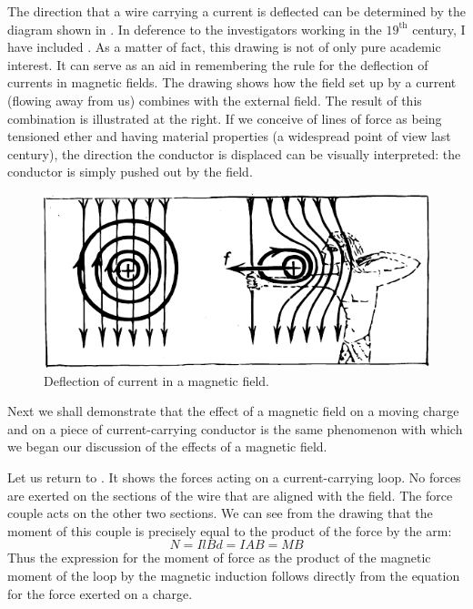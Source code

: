 The direction that a wire carrying a current is deflected can be determined by the diagram shown in . In deference to the investigators working in the $19^{\textrm{th}}$ century, I have included . As a matter of fact, this drawing is not of only pure academic interest. It can serve as an aid in remembering the rule for the deflection of currents in magnetic fields. The drawing shows how the field set up by a current (flowing away from us) combines with the external field. The result of this combination is illustrated at the right. If we conceive of lines of force as being tensioned ether and having material properties (a widespread point of view last century), the direction the conductor is displaced can be visually interpreted: the conductor is simply pushed out by the field.
\begin{figure}[!ht]
\centering
\includegraphics[width=\textwidth]{figures/fig-03-04.pdf}
\caption{Deflection of current in a magnetic field.}
\label{fig-3.4}
\end{figure}
Next we shall demonstrate that the effect of a magnetic field on a moving charge and on a piece of current-carrying conductor is the same phenomenon with which we began our discussion of the effects of a magnetic field.

Let us return to . It shows the forces acting on a current-carrying loop. No forces are exerted on the sections of the wire that are aligned with the field. The force couple acts on the other two sections. We can see from the drawing that the moment of this couple is precisely equal to the product of the force by the arm:
\begin{equation*}%
N=IlBd=IAB= MB
\end{equation*}
Thus the expression for the moment of force as the product of the magnetic moment of the loop by the magnetic induction follows directly from the equation for the force exerted on a charge.

